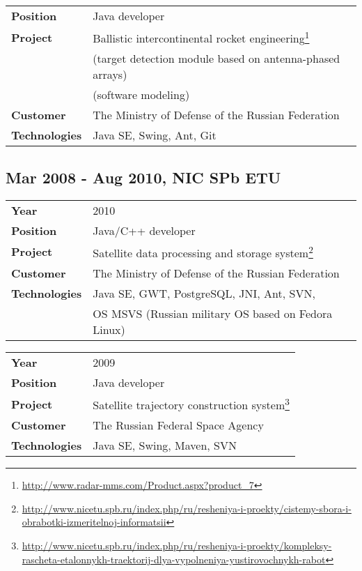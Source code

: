 \documentclass[a4paper,12pt]{article}
\begin{document}
\begin{tabular}{ll}
    \textbf{Position} & Java developer \\
    \textbf{Project} & Ballistic intercontinental rocket engineering\footnote{\url{http://www.radar-mms.com/Product.aspx?product_7}} \\
        & (target detection module based on antenna-phased arrays) \\
        & (software modeling) \\
    \textbf{Customer} & The Ministry of Defense of the Russian Federation \\
    \textbf{Technologies} & Java SE, Swing, Ant, Git \\
\end{tabular}

\subsection*{Mar 2008 - Aug 2010, NIC SPb ETU}

\begin{tabular}{ll}
    \textbf{Year} & 2010 \\
    \textbf{Position} & Java/C++ developer \\
    \textbf{Project} & Satellite data processing and storage system\footnote{\url{http://www.nicetu.spb.ru/index.php/ru/resheniya-i-proekty/cistemy-sbora-i-obrabotki-izmeritelnoj-informatsii}} \\
    \textbf{Customer} & The Ministry of Defense of the Russian Federation \\
    \textbf{Technologies} & Java SE, GWT, PostgreSQL, JNI, Ant, SVN, \\
        & OS MSVS (Russian military OS based on Fedora Linux) \\
\end{tabular}

\bigskip

\begin{tabular}{ll}
    \textbf{Year} & 2009 \\
    \textbf{Position} & Java developer \\
    \textbf{Project} & Satellite trajectory construction system\footnote{\url{http://www.nicetu.spb.ru/index.php/ru/resheniya-i-proekty/kompleksy-rascheta-etalonnykh-traektorij-dlya-vypolneniya-yustirovochnykh-rabot}} \\
    \textbf{Customer} & The Russian Federal Space Agency \\
    \textbf{Technologies} & Java SE, Swing, Maven, SVN \\
\end{tabular}
\end{document}
